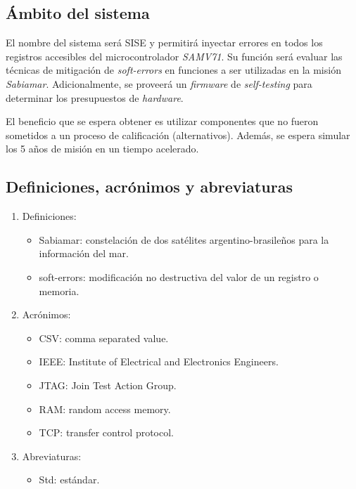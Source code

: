 \documentclass[
11pt, %
codirector, %
]{charter}
\begin{document}
\subsection{Ámbito del sistema}
\label{sub:ambito}

El nombre del sistema será SISE y permitirá inyectar errores en todos los registros accesibles del microcontrolador \emph{SAMV71}.
Su función será evaluar las técnicas de mitigación de \emph{soft-errors} en funciones a ser utilizadas en la misión \emph{Sabiamar}.
Adicionalmente, se proveerá un \emph{firmware} de \emph{self-testing} para determinar los presupuestos de \emph{hardware}.

El beneficio que se espera obtener es utilizar componentes que no fueron sometidos a un proceso de calificación (alternativos).
Además, se espera simular los 5 años de misión en un tiempo acelerado.

\subsection{Definiciones, acrónimos y abreviaturas}
\label{sub:definiciones}

\begin{enumerate}
	\item Definiciones:
		\begin{itemize}
			\item Sabiamar: constelación de dos satélites argentino-brasileños para la información del mar.
			\item soft-errors: modificación no destructiva del valor de un registro o memoria.
		\end{itemize}
	\item Acrónimos:
		\begin{itemize}
			\item CSV: comma separated value.
			\item IEEE: Institute of Electrical and Electronics Engineers.
			\item JTAG: Join Test Action Group.
			\item RAM: random access memory.
			\item TCP: transfer control protocol.
		\end{itemize}
	\item Abreviaturas:
		\begin{itemize}
			\item Std: estándar.
		\end{itemize}
\end{enumerate}
\end{document}
